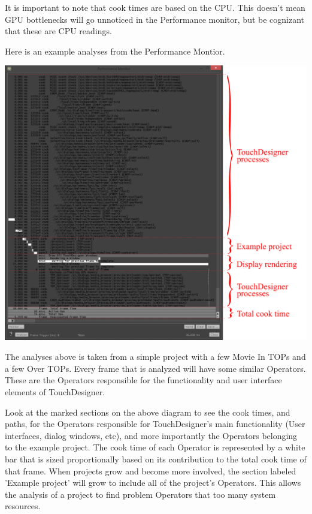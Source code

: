 \begin{fullwidth}
It is important to note that cook times are based on the CPU. This doesn't mean GPU bottlenecks will go unnoticed in the Performance monitor, but be cognizant that these are CPU readings. 

Here is an example analyses from the Performance Montior.

\begin{center}
\includegraphics[width=14cm]{./img/11.3/performance-monitor-2.png}
\end{center}

The analyses above is taken from a simple project with a few Movie In TOPs and a few Over TOPs. Every frame that is analyzed will have some similar Operators. These are the Operators responsible for the functionality and user interface elements of TouchDesigner.

Look at the marked sections on the above diagram to see the cook times, and paths, for the Operators responsible for TouchDesigner's main functionality (User interfaces, dialog windows, etc), and more importantly the Operators belonging to the example project. The cook time of each Operator is represented by a white bar that is sized proportionally based on its contribution to the total cook time of that frame. When projects grow and become more involved, the section labeled 'Example project' will grow to include all of the project's Operators. This allows the analysis of a project to find problem Operators that too many system resources. 


\end{fullwidth}
